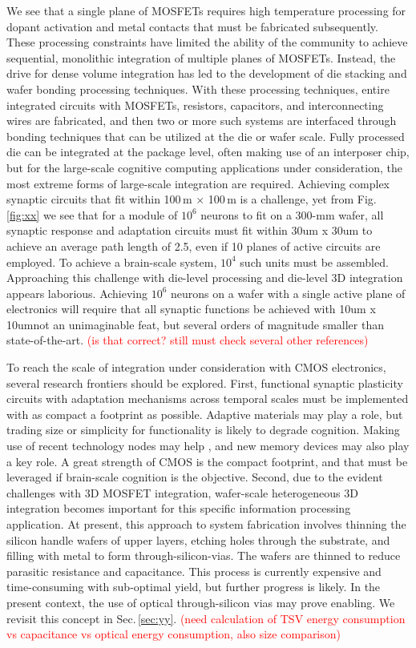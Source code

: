 \documentclass[twocolumn]{article}
\begin{document}
We see that a single plane of MOSFETs requires high temperature processing for dopant activation and metal contacts that must be fabricated subsequently. These processing constraints have limited the ability of the community to achieve sequential, monolithic integration of multiple planes of MOSFETs. Instead, the drive for dense volume integration has led to the development of die stacking \cite{} and wafer bonding \cite{} processing techniques. With these processing techniques, entire integrated circuits with MOSFETs, resistors, capacitors, and interconnecting wires are fabricated, and then two or more such systems are interfaced through bonding techniques that can be utilized at the die or wafer scale. Fully processed die can be integrated at the package level, often making use of an interposer chip, but for the large-scale cognitive computing applications under consideration, the most extreme forms of large-scale integration are required. Achieving complex synaptic circuits that fit within 100\,\textmu m $\times$ 100\,\textmu m is a challenge, yet from Fig.\,\ref{fig:xx} we see that for a module of $10^6$ neurons to fit on a 300-mm wafer, all synaptic response and adaptation circuits must fit within 30um x 30um to achieve an average path length of 2.5, even if 10 planes of active circuits are employed. To achieve a brain-scale system, $10^4$ such units must be assembled. Approaching this challenge with die-level processing and die-level 3D integration appears laborious. Achieving $10^6$ neurons on a wafer with a single active plane of electronics will require that all synaptic functions be achieved with 10um x 10um\textemdash not an unimaginable feat, but several orders of magnitude smaller than state-of-the-art. \textcolor{red}{(is that correct? still must check several other references)}

To reach the scale of integration under consideration with CMOS electronics, several research frontiers should be explored. First, functional synaptic plasticity circuits with adaptation mechanisms across temporal scales must be implemented with as compact a footprint as possible. Adaptive materials may play a role, but trading size or simplicity for functionality is likely to degrade cognition. Making use of recent technology nodes may help \cite{}, and new memory devices may also play a key role. A great strength of CMOS is the compact footprint, and that must be leveraged if brain-scale cognition is the objective. Second, due to the evident challenges with 3D MOSFET integration, wafer-scale heterogeneous 3D integration becomes important for this specific information processing application. At present, this approach to system fabrication involves thinning the silicon handle wafers of upper layers, etching holes through the substrate, and filling with metal to form through-silicon-vias. The wafers are thinned to reduce parasitic resistance and capacitance. This process is currently expensive and time-consuming with sub-optimal yield, but further progress is likely. In the present context, the use of optical through-silicon vias may prove enabling. We revisit this concept in Sec.\,\ref{sec:yy}. \textcolor{red}{(need calculation of TSV energy consumption vs capacitance vs optical energy consumption, also size comparison)}
\end{document}

